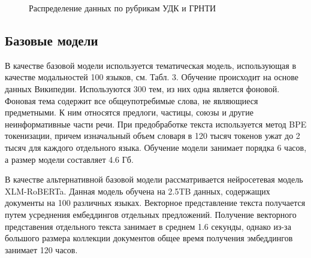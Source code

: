\documentclass[12pt, twoside]{article}
\begin{document}
\begin{figure}[H]
 \caption{Распределение данных по рубрикам УДК и ГРНТИ}
  \label{fig:1}
\end{figure}

\subsection{Базовые модели}

В качестве базовой модели используется тематическая модель, использующая в качестве модальностей 100 языков, см. Табл. 3. Обучение происходит на основе данных Википедии. Используются 300 тем, из них одна является фоновой. Фоновая тема содержит все общеупотребимые слова, не являющиеся предметными. К ним относятся предлоги, частицы, союзы и другие неинформативные части речи. При предобработке текста используется метод BPE токенизации, причем изначальный объем словаря в 120 тысяч токенов ужат до 2 тысяч для каждого отдельного языка. Обучение модели занимает порядка 6 часов, а размер модели составляет 4.6 Гб. 

В качестве альтернативной базовой модели рассматривается нейросетевая модель XLM-RoBERTa\cite{Roberta}. Данная модель обучена на 2.5TB данных, содержащих документы на 100 различных языках. Векторное представление текста получается путем усреднения ембеддингов отдельных предложений. Получение векторного представения отдельного текста занимает в среднем 1.6 секунды, однако из-за большого размера коллекции документов общее время получения эмбеддингов занимает 120 часов.
\end{document}
